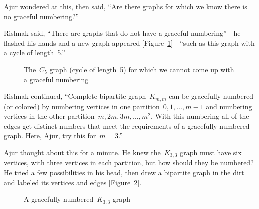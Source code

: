 Ajur wondered at this, then said, ``Are there graphs for which we know there is no graceful numbering?''

Rishnak said, ``There are graphs that do not have a graceful numbering''---he flashed his hands and a new graph appeared [Figure~\ref{19g4}]---``such as this graph with a cycle of length~5.''

\begin{figure}
\begin{center}


\caption{The~$C_5$ graph (cycle of length~5) for which we cannot come up with a graceful numbering}\label{19g4}
\end{center}
\end{figure}

Rishnak continued, ``Complete bipartite graph~$K_{m,m}$ can be gracefully numbered (or colored) by numbering vertices in one partition~$0,1,\ldots,m-1$ and numbering vertices in the other partition~$m,2m,3m,\ldots,m^2$. With this numbering all of the edges get distinct numbers that meet the requirements of a gracefully numbered graph. Here, Ajur, try this for~$m=3$.''

Ajur thought about this for a minute. He knew the~$K_{3,3}$ graph must have six vertices, with three vertices in each partition, but how should they be numbered? He tried a few possibilities in his head, then drew a bipartite graph in the dirt and labeled its vertices and edges [Figure~\ref{18g45}].

\begin{figure}
\begin{center}

\caption{A gracefully numbered~$K_{3,3}$ graph}\label{18g45}
\end{center}
\end{figure}

